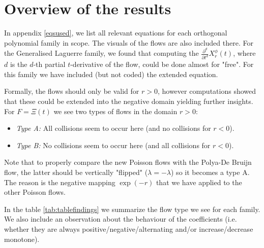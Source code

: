 \documentclass[a4paper,11pt,twoside]{amsart}
\begin{document}
\section{Overview of the results} \label{results}
In appendix \ref{eqsused}, we list all relevant equations for each orthogonal polynomial family in scope. The visuals of the flows are also included there. For the Generalised Laguerre family, we found that computing the $\frac{\partial^{d}}{\partial t^{d}} X^{\mathcal{\phi}}_r(t)$, where $d$ is the $d$-th partial $t$-derivative of the flow, could be done almost for "free". For this family we have included (but not coded) the extended equation.  

Formally, the flows should only be valid for $r > 0$, however computations showed that these could be extended into the negative domain yielding further insights. For $F=\Xi(t)$ we see two types of flows in the domain $r > 0$:
\begin{itemize}
  \item \textit{Type A:} All collisions seem to occur here (and no collisions for $r < 0$).
  \item \textit{Type B:} No collisions seem to occur here (and all collisions for $r < 0$).
\end{itemize}

Note that to properly compare the new Poisson flows with the Polya-De Bruijn flow, the latter should be vertically "flipped" ($\lambda = -\lambda$) so it becomes a type A. The reason is the negative mapping $\exp(-r)$ that we have applied to the other Poisson flows. 

In the table \ref{tab:tablefindings} we summarize the flow type we see for each family. We also include an observation about the behaviour of the coefficients (i.e. whether they are always positive/negative/alternating and/or increase/decrease monotone).
\end{document}
